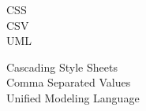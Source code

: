 \begin{figure}[!h]
		\bigskip
		\bigskip
		\hspace{0.5cm}
		\begin{minipage}[h]{0.1\textwidth}
		  CSS \\
		  CSV \\
		  UML \\
		\end{minipage}
		\begin{minipage}[h]{0.8\textwidth}
		  Cascading Style Sheets \\
		  Comma Separated Values \\
		  Unified Modeling Language \\		 
		\end{minipage}
	\end{figure}	
	 
			  
			  
			  